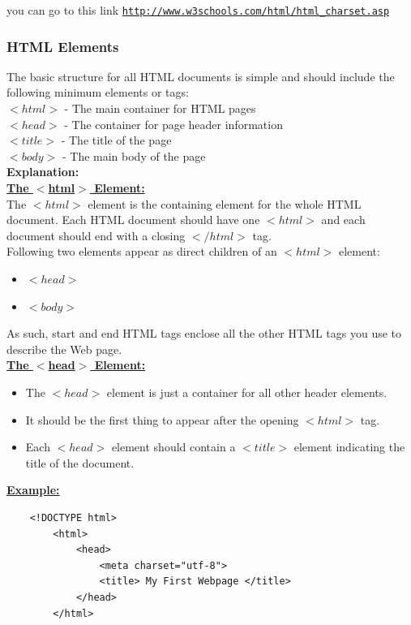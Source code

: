 \documentclass[11pt,a4paper]{article}
\begin{document}
you can go to this link \texttt{\underline{http://www.w3schools.com/html/html\_charset.asp}}

\subsubsection*{HTML Elements}
The basic structure for all HTML documents is simple and should include the following minimum elements or tags:\\

$<html>$ - The main container for HTML pages\\

$<head>$ - The container for page header information\\

$<title>$ - The title of the page\\

$<body>$ - The main body of the page\\

{\large{\textbf{Explanation:}}}\\

\underline{\textbf{The $<$html$>$ Element:}}\\

The $<html>$ element is the containing element for the whole HTML document. Each HTML document should have one $<html>$ and each document should end with a closing $</html>$ tag.\\
Following two elements appear as direct children of an $<html>$ element:
\begin{itemize}
\item $<head>$
\item $<body>$
\end{itemize}
As such, start and end HTML tags enclose all the other HTML tags you use to describe the Web page.\\

\underline{\textbf{The $<$head$>$ Element:}}\\
\begin{itemize}
\item The $<head>$ element is just a container for all other header elements.
\item It should be the first thing to appear after the opening $<html>$ tag.
\item Each $<head>$ element should contain a $<title>$ element indicating the title of the document.
\end{itemize}

\underline{\textbf{Example:}}
\begin{verbatim}
    <!DOCTYPE html>
        <html>
            <head>
                <meta charset="utf-8">
                <title> My First Webpage </title>
            </head>
        </html>
\end{verbatim}
\end{document}
